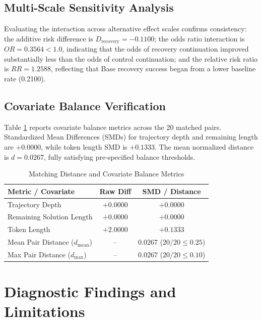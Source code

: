 \documentclass[conference]{IEEEtran}
\begin{document}
\subsection{Multi-Scale Sensitivity Analysis}
Evaluating the interaction across alternative effect scales confirms consistency: the additive risk difference is $D_{\text{recovery}} = -0.1100$; the odds ratio interaction is $OR = 0.3564 < 1.0$, indicating that the odds of recovery continuation improved substantially less than the odds of control continuation; and the relative risk ratio is $RR = 1.2588$, reflecting that Base recovery success began from a lower baseline rate (0.2100).

\subsection{Covariate Balance Verification}
Table \ref{tab:sensitivity} reports covariate balance metrics across the 20 matched pairs. Standardized Mean Differences (SMDs) for trajectory depth and remaining length are $+0.0000$, while token length SMD is $+0.1333$. The mean normalized distance is $d = 0.0267$, fully satisfying pre-specified balance thresholds.

\begin{table}[htbp]
\caption{Matching Distance and Covariate Balance Metrics}
\label{tab:sensitivity}
\centering
\begin{tabularx}{\columnwidth}{Xcc}
\toprule
\textbf{Metric / Covariate} & \textbf{Raw Diff} & \textbf{SMD / Distance} \\
\midrule
Trajectory Depth & $+0.0000$ & $+0.0000$ \\
Remaining Solution Length & $+0.0000$ & $+0.0000$ \\
Token Length & $+2.0000$ & $+0.1333$ \\
\midrule
Mean Pair Distance ($d_{\text{mean}}$) & -- & $0.0267$ ($20/20 \le 0.25$) \\
Max Pair Distance ($d_{\max}$) & -- & $0.0267$ ($20/20 \le 0.10$) \\
\bottomrule
\end{tabularx}
\end{table}

\section{Diagnostic Findings and Limitations}
\end{document}
